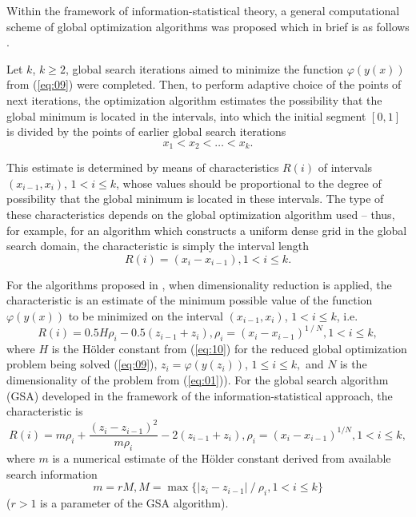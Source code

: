 \documentclass[runningheads]{llncs}
\begin{document}
Within the framework of information-statistical theory, a general computational scheme of global optimization algorithms was proposed which in brief is as follows \cite{c15,c30,c35}.

Let $k$, $k \geq 2$, global search iterations aimed to minimize the function $\varphi(y(x))$ from (\ref{eq:09}) were completed. Then, to perform adaptive choice of the points of next iterations, the optimization algorithm estimates the possibility that the global minimum is located  in the intervals, into which the initial segment $[0,1]$ is divided by the points of earlier global search  iterations
\begin{equation}
\label{eq:11}
x_1<x_2< \dots <x_k.
\end{equation}

This estimate is determined by means of characteristics $R(i)$ of intervals $(x_{i-1},x_i)$, $1 < i \leq k$, whose values should be proportional to the degree of possibility that the global minimum is located  in these intervals. The type of these characteristics depends on the global optimization algorithm used -- thus, for example, for an algorithm which constructs a uniform dense grid in the global search domain, the characteristic is simply the interval length 
\begin{equation}
\label{eq:12}
R(i)=(x_i-x_{i-1}), 1 < i \leq k.
\end{equation}


For the algorithms proposed in \cite{c22,c23}, when dimensionality reduction is applied, the characteristic is an estimate of the minimum possible value of the function $\varphi(y(x))$ to be minimized on the interval $(x_{i-1},x_i )$, $1 < i \leq k$, i.e.
\begin{equation}
\label{eq:13}
R(i) = 0.5 H \rho_i - 0.5 (z_{i-1} + z_i ), \rho_i = (x_i-x_{i-1} )^{1⁄N}, 1 < i \leq k,
\end{equation}
where $H$ is the H{\" o}lder constant from (\ref{eq:10}) for the reduced global optimization problem being solved (\ref{eq:09}), $z_i = \varphi(y(z_i))$, $1 \leq i \leq k,$ and $N$ is the dimensionality of the problem from (\ref{eq:01})).  For the global search algorithm (GSA) \cite{c15,c24} developed in the framework of the information-statistical approach, the characteristic is
\begin{equation}
\label{eq:14}
R(i)=m\rho_i+\frac{(z_i-z_{i-1})^2}{m\rho_i}-2(z_{i-1}+z_i ),\rho_i=(x_i-x_{i-1})^{1/N}, 1 < i \leq k,
\end{equation}
where $m$ is a numerical estimate of the H{\" o}lder constant derived from available search information
\begin{equation}
\label{eq:15}
m= r M, M = \max \{ |z_i-z_{i-1} | ⁄ \rho_i, 1 < i \leq  k \}
\end{equation}
 ($r>1$ is a parameter of the GSA algorithm).
\end{document}
